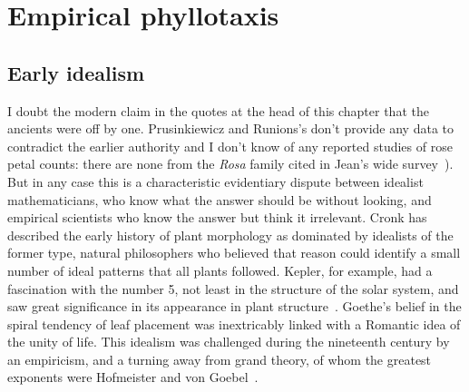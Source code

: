  
    \chapter{Empirical phyllotaxis}
  \label{ch:empirical}

\section{Early idealism}

  I doubt the modern claim in the quotes at the head of this chapter that the ancients were off by one.  Prusinkiewicz and Runions's don't provide any data to contradict the earlier authority and I don't know of any reported studies of rose petal counts: there are none from the \emph{Rosa} family cited in Jean's wide survey~\cite{jeanPhyllotaxisSystemicStudy1994}). But in any case this is a  characteristic evidentiary dispute between idealist mathematicians, who know what the answer should be without looking, and empirical scientists who know the answer but think it irrelevant.
  Cronk has described the early history of plant morphology as dominated by idealists of the former type, natural philosophers who believed that reason could identify a small number of ideal patterns that all plants followed. Kepler, for example, had a fascination with the number 5, not least in the structure of the solar system,  and saw great significance in its appearance in plant structure~\cite{keplerSixCorneredSnowflake16112014}. Goethe's belief in the spiral tendency of leaf placement was inextricably linked with a Romantic idea of the unity of life. This idealism was challenged during the nineteenth century by an empiricism, and a turning away from grand theory,  of whom the greatest exponents were Hofmeister and von Goebel~\autocite{cronkMolecularOrganographyPlants2009}.
  
